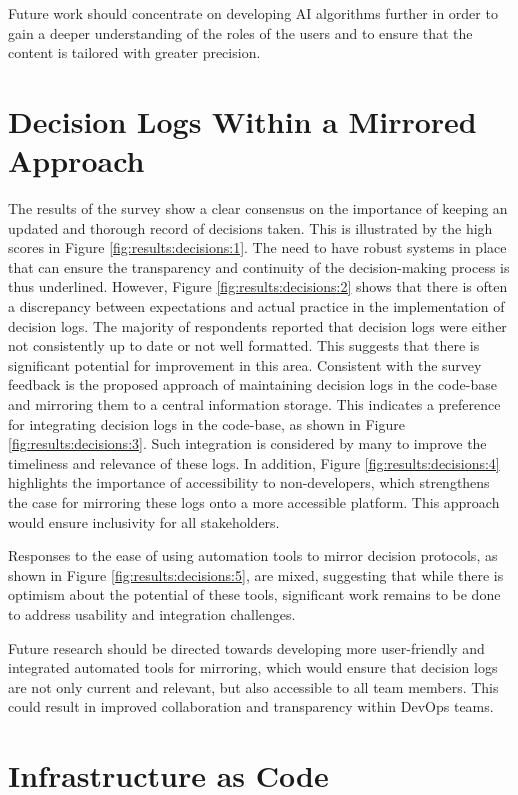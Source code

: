 Future work should concentrate on developing \ac{AI} algorithms further in order to gain a deeper understanding of the roles of the users and to ensure that the content is tailored with greater precision.


\section{Decision Logs Within a Mirrored Approach}
The results of the survey show a clear consensus on the importance of keeping an updated and thorough record of decisions taken. This is illustrated by the high scores in Figure \ref{fig:results:decisions:1}. The need to have robust systems in place that can ensure the transparency and continuity of the decision-making process is thus underlined. However, Figure \ref{fig:results:decisions:2} shows that there is often a discrepancy between expectations and actual practice in the implementation of decision logs. The majority of respondents reported that decision logs were either not consistently up to date or not well formatted. This suggests that there is significant potential for improvement in this area.
Consistent with the survey feedback is the proposed approach of maintaining decision logs in the code-base and mirroring them to a central information storage. This indicates a preference for integrating decision logs in the code-base, as shown in Figure \ref{fig:results:decisions:3}. Such integration is considered by many to improve the timeliness and relevance of these logs. In addition, Figure \ref{fig:results:decisions:4} highlights the importance of accessibility to non-developers, which strengthens the case for mirroring these logs onto a more accessible platform. This approach would ensure inclusivity for all stakeholders.

Responses to the ease of using automation tools to mirror decision protocols, as shown in Figure \ref{fig:results:decisions:5}, are mixed, suggesting that while there is optimism about the potential of these tools, significant work remains to be done to address usability and integration challenges.

Future research should be directed towards developing more user-friendly and integrated automated tools for mirroring, which would ensure that decision logs are not only current and relevant, but also accessible to all team members. This could result in improved collaboration and transparency within \ac{DevOps} teams.


\section{Infrastructure as Code}

